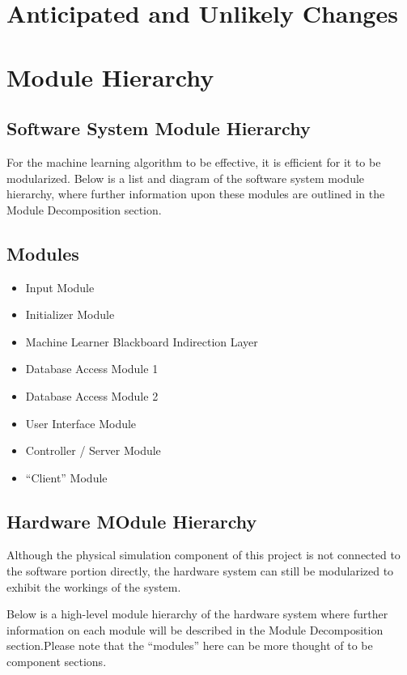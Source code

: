 \documentclass[12pt, titlepage]{article}
\begin{document}
\section{Anticipated and Unlikely Changes}

\section{Module Hierarchy}
\subsection{Software System Module Hierarchy}
For the machine learning algorithm to be effective, it is efficient for it to be modularized. Below is a list and diagram of the software system module hierarchy, where further information upon these modules are outlined in the Module Decomposition section.

\subsection{Modules}
\begin{itemize}
  \item Input Module
  \item Initializer Module
  \item Machine Learner Blackboard Indirection Layer
  \item Database Access Module 1
  \item Database Access Module 2
  \item User Interface Module
  \item Controller / Server Module
  \item “Client” Module
\end{itemize}

\subsection{Hardware MOdule Hierarchy}
Although the physical simulation component of this project is not connected to the software portion directly, the hardware system can still be modularized to exhibit the workings of the system.
\par 
Below is a high-level module hierarchy of the hardware system where further information on each module will be described in the Module Decomposition section.Please note that the “modules” here can be more thought of to be component sections.
\par
\end{document}
